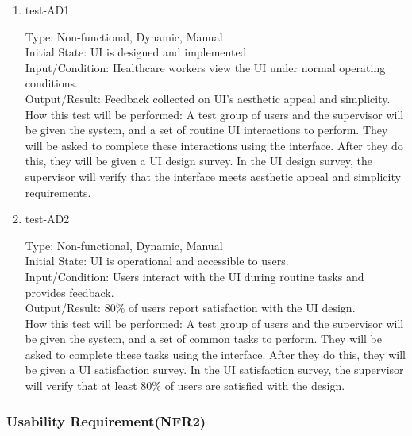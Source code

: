 \documentclass[12pt, titlepage]{article}
\begin{document}
\begin{enumerate}
    \item{test-AD1\\} \label{test-AD1}
    
    Type: Non-functional, Dynamic, Manual\\
    
    Initial State: UI is designed and implemented.\\
    
    Input/Condition: Healthcare workers view the UI under normal operating conditions.\\
    
    Output/Result: Feedback collected on UI’s aesthetic appeal and simplicity.\\
    
    How this test will be performed: A test group of users and the supervisor will be given the system, and a set of routine UI interactions to perform. They will be asked to complete these interactions using the interface. After they do this, they will be given a UI design survey. In the UI design survey, the supervisor will verify that the interface meets aesthetic appeal and simplicity requirements.


    \item{test-AD2\\} \label{test-AD2}
    
    Type: Non-functional, Dynamic, Manual\\
    
    Initial State: UI is operational and accessible to users.\\
    
    Input/Condition: Users interact with the UI during routine tasks and provides feedback.\\
    
    Output/Result: 80\% of users report satisfaction with the UI design.\\
    
    How this test will be performed: A test group of users and the supervisor will be given the system, and a set of common tasks to perform. They will be asked to complete these tasks using the interface. After they do this, they will be given a UI satisfaction survey. In the UI satisfaction survey, the supervisor will verify that at least 80\% of users are satisfied with the design.
\end{enumerate}

\subsubsection{Usability Requirement(NFR2)} \label{section:4.2.2}
\end{document}
